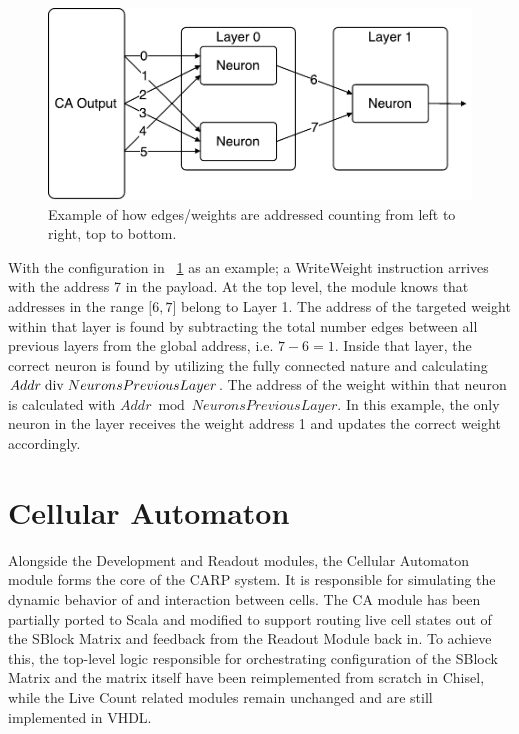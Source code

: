 \begin{figure}[ht]
  \centering
  \includegraphics[width=0.6\linewidth]{fig/readout-addressing-scheme}
  \caption{Example of how edges/weights are addressed counting from left to right, top to bottom.}
  \label{fig:readout-addressing-scheme}
\end{figure}

With the configuration in \figurename~\ref{fig:readout-addressing-scheme} as an
example; a WriteWeight instruction arrives with the address 7 in the payload. At
the top level, the module knows that addresses in the range $\lbrack 6, 7 \rbrack$ belong to
Layer 1. The address of the targeted weight within that layer is found by
subtracting the total number edges between all previous layers from the global
address, i.e. $7 - 6 = 1$. Inside that layer, the correct neuron is found by
utilizing the fully connected nature and calculating $Addr \bdiv NeuronsPrevious
Layer$. The address of the weight within that neuron is calculated with $Addr
\bmod NeuronsPreviousLayer$. In this example, the only neuron in the layer
receives the weight address 1 and updates the correct weight accordingly.

\section{Cellular Automaton}
\label{sec:cellular-automaton}

Alongside the Development and Readout modules, the Cellular Automaton module forms
the core of the CARP system. It is responsible for simulating the dynamic
behavior of and interaction between cells. The CA module has been partially
ported to Scala and modified to support routing live cell states out of the
SBlock Matrix and feedback from the Readout Module back in. To achieve this, the
top-level logic responsible for orchestrating configuration of the SBlock Matrix
and the matrix itself have been reimplemented from scratch in Chisel, while the
Live Count related modules remain unchanged and are still implemented in VHDL.

